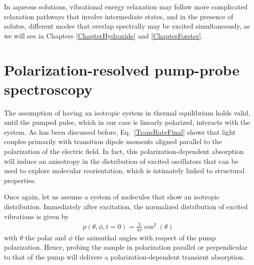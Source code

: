 In aqueous solutions, vibrational energy relaxation may follow more complicated relaxation pathways that involve intermediate states, and in the presence of solutes, different modes that overlap spectrally may be excited simultaneously, as we will see in Chapters \ref{ChapterHydroxide} and \ref{ChapterForster}.


  

\section{Polarization-resolved pump-probe spectroscopy}\label{Eqs_PR-TRVS}


The assumption of having an isotropic system in thermal equilibrium holds valid, until the pumped pulse, which in our case is linearly polarized, interacts with the system. As has been discussed before, Eq.\ \ref{TransRateFinal} shows that light couples primarily with transition dipole moments aligned parallel to the polarization of the electric field. In fact, this polarization-dependent absorption will induce an anisotropy in the distribution of excited oscillators that can be used to explore molecular reorientation, which is intimately linked to structural properties. 


Once again, let us assume a system of molecules that show an isotropic distribution. Immediately after excitation, the normalized distribution of excited vibrations is given by
\begin{eqnarray}
p(\theta,\phi,t=0) = \frac{3}{4 \pi} \cos^2 (\theta)
\label{distributionexcitestate}
\end{eqnarray}
with $\theta$ the polar and $\phi$ the azimuthal angles with respect of the pump polarization. Hence, probing the sample in polarization parallel or perpendicular to that of the pump will delivers a polarization-dependent transient absorption. 


